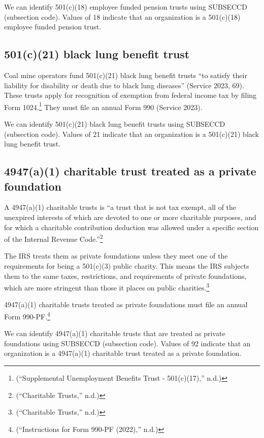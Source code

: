 \documentclass[
  letterpaper,
  DIV=11,
  numbers=noendperiod]{scrreprt}
\begin{document}
We can identify 501(c)(18) employee funded pension trusts using SUBSECCD
(subsection code). Values of 18 indicate that an organization is a
501(c)(18) employee funded pension trust.

\hypertarget{c21-black-lung-benefit-trust}{%
\subsection{501(c)(21) black lung benefit
trust}\label{c21-black-lung-benefit-trust}}

Coal mine operators fund 501(c)(21) black lung benefit trusts ``to
satisfy their liability for disability or death due to black lung
diseases'' (Service 2023, 69). These trusts apply for recognition of
exemption from federal income tax by filing Form 1024.\footnote{({``Supplemental
  Unemployment Benefits Trust - 501(c)(17),''} n.d.)} They must file an
annual Form 990 (Service 2023).

We can identify 501(c)(21) black lung benefit trusts using SUBSECCD
(subsection code). Values of 21 indicate that an organization is a
501(c)(21) black lung benefit trust.

\hypertarget{a1-charitable-trust-treated-as-a-private-foundation}{%
\subsection{4947(a)(1) charitable trust treated as a private
foundation}\label{a1-charitable-trust-treated-as-a-private-foundation}}

A 4947(a)(1) charitable trusts is ``a trust that is not tax exempt, all
of the unexpired interests of which are devoted to one or more
charitable purposes, and for which a charitable contribution deduction
was allowed under a specific section of the Internal Revenue
Code.''\footnote{({``Charitable Trusts,''} n.d.)}

The IRS treats them as private foundations unless they meet one of the
requirements for being a 501(c)(3) public charity. This means the IRS
subjects them to the same taxes, restrictions, and requirements of
private foundations, which are more stringent than those it places on
public charities.\footnote{({``Charitable Trusts,''} n.d.)}

4947(a)(1) charitable trusts treated as private foundations must file an
annual Form 990-PF.\footnote{({``Instructions for Form 990-PF (2022),''}
  n.d.)}

We can identify 4947(a)(1) charitable trusts that are treated as private
foundations using SUBSECCD (subsection code). Values of 92 indicate that
an organization is a 4947(a)(1) charitable trust treated as a private
foundation.
\end{document}
